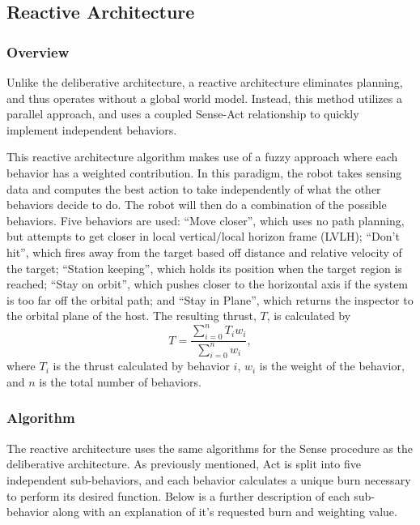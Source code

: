 \documentclass[journal, 10pt]{IEEEtran}
\begin{document}
\subsection{Reactive Architecture}
\subsubsection{Overview}
Unlike the deliberative architecture, a reactive architecture eliminates planning, and thus operates without a global world model. Instead, this method utilizes a parallel approach, and uses a coupled Sense-Act relationship to quickly implement independent behaviors\cite{joshi}.

This reactive architecture algorithm makes use of a fuzzy approach where each behavior has a weighted contribution. In this paradigm, the robot takes sensing data and computes the best action to take independently of what the other behaviors decide to do. The robot will then do a combination of the possible behaviors. Five behaviors are used: ``Move closer'', which uses no path planning, but attempts to get closer in local vertical/local horizon frame (LVLH); ``Don't hit'', which fires away from the target based off distance and relative velocity of the target; ``Station keeping'', which holds its position when the target region is reached; ``Stay on orbit'', which pushes closer to the horizontal axis if the system is too far off the orbital path; and ``Stay in Plane'', which returns the inspector to the orbital plane of the host. The resulting thrust, $T$, is calculated by
\begin{equation}
T = \frac{ \sum^{n}_{i=0} T_i w_i} { \sum^{n}_{i=0} w_i },
\end{equation}
where $T_i$ is the thrust calculated by behavior $i$, $w_i$ is the weight of the behavior, and $n$ is the total number of behaviors.

\subsubsection{Algorithm}
The reactive architecture uses the same algorithms for the Sense procedure as the deliberative architecture.  As previously mentioned, Act is split into five independent sub-behaviors, and each behavior calculates a unique burn necessary to perform its desired function.  Below is a further description of each sub-behavior along with an explanation of it's requested burn and weighting value.
\end{document}
